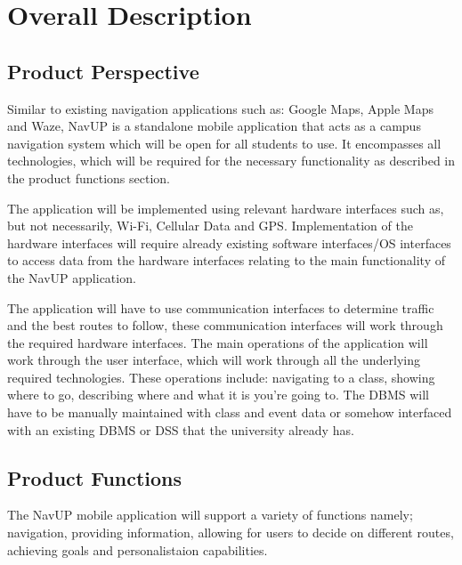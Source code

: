\documentclass[11pt,a4paper]{article}
\begin{document}
		

\newpage
\section{Overall Description}
	\subsection{Product Perspective}
	Similar to existing navigation applications such as: Google Maps, Apple Maps and Waze, NavUP is a standalone mobile application that acts as a campus navigation system which will be open for all students to use. It encompasses all technologies, which will be required for the necessary functionality as described in the product functions section. 
\\
\par
The application will be implemented using relevant hardware interfaces such as, but not necessarily, Wi-Fi, Cellular Data and GPS. Implementation of the hardware interfaces will require already existing software interfaces/OS interfaces to access data from the hardware interfaces relating to the main functionality of the NavUP application. 
\\
\par
The application will have to use communication interfaces to determine traffic and the best routes to follow, these communication interfaces will work through the required hardware interfaces. The main operations of the application will work through the user interface, which will work through all the underlying required technologies. These operations include: navigating to a class, showing where to go, describing where and what it is you’re going to. The DBMS will have to be manually maintained with class and event data or somehow interfaced with an existing DBMS or DSS that the university already has. 

	\subsection{Product Functions}
	The NavUP mobile application will support a variety of functions namely; navigation, providing information, allowing for users to decide on different routes, achieving goals and personalistaion capabilities.
	\\
\end{document}
